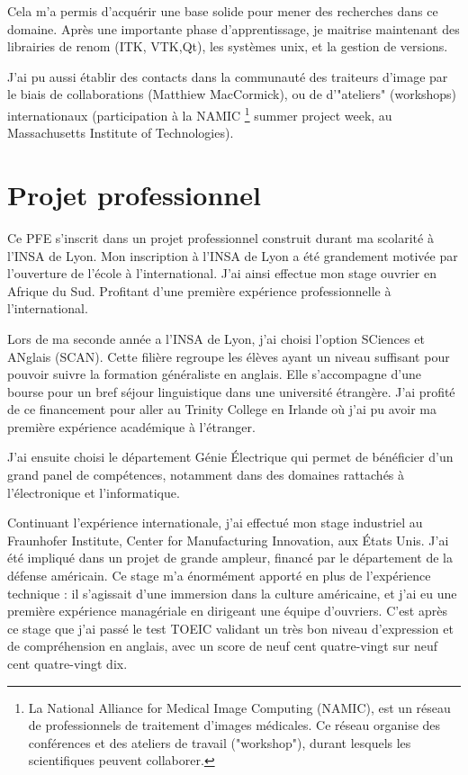 Cela m'a permis d'acquérir une base solide pour mener des recherches dans ce domaine.
Après une importante phase d'apprentissage, je maitrise maintenant des librairies de renom
(ITK, VTK,Qt), les systèmes unix, et la gestion de versions.

J'ai pu aussi établir des contacts dans la communauté
des traiteurs d'image par le biais de collaborations
(Matthiew MacCormick), ou de d'"ateliers" (workshops) internationaux
(participation à la NAMIC
\footnote{La National Alliance for Medical Image Computing (NAMIC), est un réseau de professionnels de traitement d'images médicales. Ce réseau organise des conférences et des ateliers de travail ("workshop"), durant lesquels les scientifiques peuvent collaborer.}
summer project week, au Massachusetts Institute of Technologies).


\section{Projet professionnel}

Ce PFE s'inscrit dans un projet professionnel construit durant ma scolarité à l'INSA de Lyon.
Mon inscription à l'INSA de Lyon a été grandement motivée par l'ouverture de l'école à l'international. J'ai ainsi effectue mon stage ouvrier en Afrique du Sud. Profitant d'une première expérience professionnelle à l'international.

Lors de ma seconde année a l'INSA de Lyon, j'ai choisi l'option SCiences et ANglais (SCAN).
Cette filière regroupe les élèves ayant un niveau suffisant pour pouvoir suivre la formation généraliste en anglais.
Elle s'accompagne d'une bourse pour un bref séjour linguistique dans une université étrangère.
J'ai profité de ce financement pour aller au Trinity College en Irlande où
j'ai pu avoir ma première expérience académique à l'étranger.

J'ai ensuite choisi le département
Génie Électrique qui permet de bénéficier d'un grand panel de compétences,
notamment dans des domaines rattachés à l'électronique et l'informatique.


Continuant l'expérience internationale, j'ai effectué mon stage industriel au
Fraunhofer Institute, Center for Manufacturing Innovation, aux États Unis.
J'ai été impliqué dans un projet de grande ampleur, financé par le département de la défense américain.
Ce stage m'a énormément apporté en plus de l'expérience technique : il s'agissait d'une immersion dans la culture américaine, et j'ai eu une première expérience managériale en dirigeant une équipe d'ouvriers.
C'est après ce stage que j'ai passé le test TOEIC validant un très bon niveau d'expression et de compréhension en anglais,
avec un score de neuf cent quatre-vingt sur neuf cent quatre-vingt dix.


